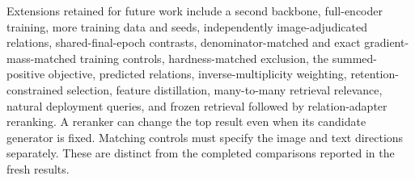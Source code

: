Extensions retained for future work include a second backbone, full-encoder training, more training data and seeds, independently image-adjudicated relations, shared-final-epoch contrasts, denominator-matched and exact gradient-mass-matched training controls, hardness-matched exclusion, the summed-positive objective, predicted relations, inverse-multiplicity weighting, retention-constrained selection, feature distillation, many-to-many retrieval relevance, natural deployment queries, and frozen retrieval followed by relation-adapter reranking. A reranker can change the top result even when its candidate generator is fixed. Matching controls must specify the image and text directions separately. These are distinct from the completed comparisons reported in the fresh results.
